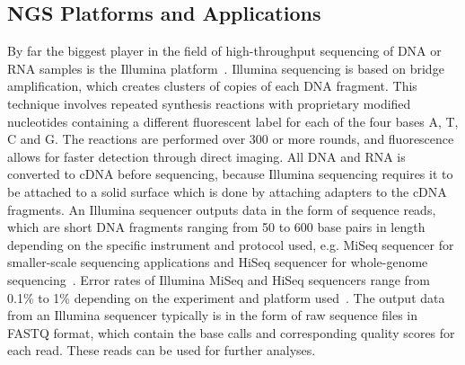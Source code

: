 \subsection{NGS Platforms and Applications}
By far the biggest player in the field of high-throughput sequencing of \ac{DNA} or \ac{RNA} samples is the Illumina platform~\cite{illumina2015introduction}. Illumina sequencing is based on bridge amplification, which creates clusters of copies of each \ac{DNA} fragment. This technique involves repeated synthesis reactions with proprietary modified nucleotides containing a different fluorescent label for each of the four bases A, T, C and G. The reactions are performed over 300 or more rounds, and fluorescence allows for faster detection through direct imaging. All \ac{DNA} and \ac{RNA} is converted to \ac{cDNA} before sequencing, because Illumina sequencing requires it to be attached to a solid surface which is done by attaching adapters to the \ac{cDNA} fragments. An Illumina sequencer outputs data in the form of sequence reads, which are short \ac{DNA} fragments ranging from 50 to 600 base pairs in length depending on the specific instrument and protocol used, e.g. MiSeq sequencer for smaller-scale sequencing applications and HiSeq sequencer for whole-genome sequencing~\cite{mardis2008next, slatko2018overview, illumina2015introduction}. Error rates of Illumina MiSeq and HiSeq sequencers range from 0.1\% to 1\% depending on the experiment and platform used~\cite{illumina2015introduction}. The output data from an Illumina sequencer typically is in the form of raw sequence files in FASTQ format, which contain the base calls and corresponding quality scores for each read. These reads can be used for further analyses.

